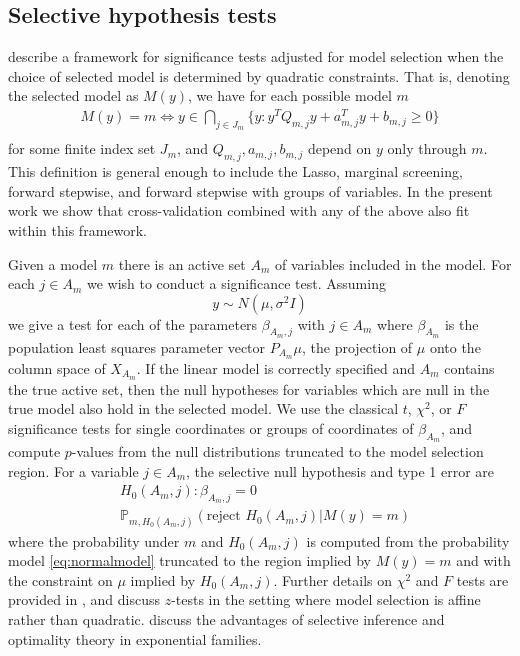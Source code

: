 \documentclass[preprint]{imsart}
\begin{document}
\subsection{Selective hypothesis tests}

\cite{loftus2015groups} describe a framework for significance tests
adjusted for model selection when the choice of selected model is
determined by quadratic constraints. That is, denoting the selected
model as $M(y)$, we have for each possible model $m$
\begin{equation}
\begin{aligned}
  \label{eq:quaddecomp}
  M(y) = m \iff y \in \bigcap_{j \in J_m} \{ y : y^TQ_{m,j}y + a_{m,j}^Ty + b_{m,j} \geq 0 \}\\
\end{aligned}
\end{equation}
for some finite index set $J_m$, and $Q_{m,j}, a_{m,j}, b_{m,j}$
depend on $y$ only through $m$. This definition is general enough to
include the Lasso, marginal screening, forward stepwise, and forward
stepwise with groups of variables. In the present work we show that
cross-validation combined with any of the above also fit within this
framework.

Given a model $m$ there is an active set $A_m$ of variables included
in the model. For each $j \in A_m$ we wish to conduct a significance
test. Assuming
\begin{equation}
  \label{eq:normalmodel}
  y \sim N(\mu, \sigma^2I)
\end{equation}
we give a test for each of the parameters $\beta_{A_m,j}$ with
$j \in A_m$ where $\beta_{A_m}$ is the population least squares
parameter vector $P_{A_m}\mu$, the projection of $\mu$ onto the
column space of $X_{A_m}$. If the linear model is correctly specified
and $A_m$ contains the true active set, then the null hypotheses
for variables which are null in the true model also hold in the
selected model. We use the classical $t$, $\chi^2$, or $F$
significance tests for single coordinates or groups of coordinates
of $\beta_{A_m}$, and compute $p$-values from the null distributions
truncated to the model selection region. For a variable $j \in A_m$,
the selective null hypothesis and type 1 error are
\begin{equation}
  \label{eq:nullhyp}
  \begin{aligned}
  & H_0(A_m,j) : \beta_{A_m,j} = 0 \\
  & \mathbb P_{m, H_0(A_m,j)}(\text{reject } H_0(A_m,j)|M(y) = m)
  \end{aligned}
\end{equation}
where the probability under $m$ and $H_0(A_m,j)$ is computed from
the probability model \eqref{eq:normalmodel} truncated to the region
implied by $M(y) = m$ and with the constraint on $\mu$ implied by
$H_0(A_m, j)$.
Further details on $\chi^2$ and $F$
tests are provided in \cite{loftus2015groups}, and \cite{lee2013exact}
discuss $z$-tests in the setting where model selection is affine
rather than quadratic.
\cite{fithian2014optimal} discuss the advantages of
selective inference and optimality theory in exponential families.
\end{document}

